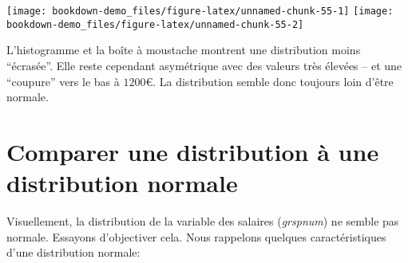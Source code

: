 \documentclass[
]{book}
\newenvironment{Shaded}{\begin{snugshade}}{\end{snugshade}}
\newcommand{\AttributeTok}[1]{\textcolor[rgb]{0.77,0.63,0.00}{#1}}
\newcommand{\CommentTok}[1]{\textcolor[rgb]{0.56,0.35,0.01}{\textit{#1}}}
\newcommand{\FunctionTok}[1]{\textcolor[rgb]{0.00,0.00,0.00}{#1}}
\newcommand{\NormalTok}[1]{#1}
\newcommand{\SpecialCharTok}[1]{\textcolor[rgb]{0.00,0.00,0.00}{#1}}
\newcommand{\StringTok}[1]{\textcolor[rgb]{0.31,0.60,0.02}{#1}}
\begin{document}
\begin{Shaded}
\end{Shaded}

\texttt{[image: bookdown-demo\_files/figure-latex/unnamed-chunk-55-1]} \texttt{[image: bookdown-demo\_files/figure-latex/unnamed-chunk-55-2]}

L'histogramme et la boîte à moustache montrent une distribution moins ``écrasée''. Elle reste cependant asymétrique avec des valeurs très élevées -- et une ``coupure'' vers le bas à \(1200€\). La distribution semble donc toujours loin d'être normale.

\hypertarget{comparer-une-distribution-uxe0-une-distribution-normale}{%
\section{Comparer une distribution à une distribution normale}\label{comparer-une-distribution-uxe0-une-distribution-normale}}

Visuellement, la distribution de la variable des salaires (\emph{grspnum}) ne semble pas normale. Essayons d'objectiver cela. Nous rappelons quelques caractéristiques d'une distribution normale:
\end{document}
